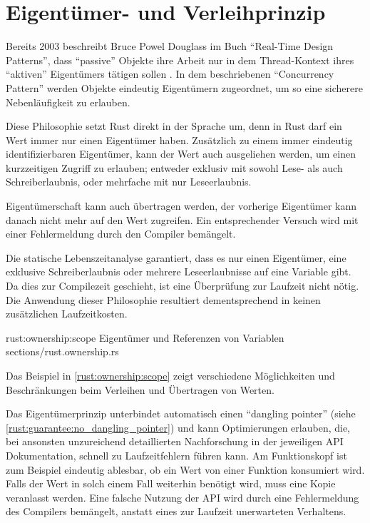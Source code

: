 \section{Eigentümer- und Verleihprinzip}
\label{rust:ownership}

Bereits 2003 beschreibt Bruce Powel Douglass im Buch \enquote{Real-Time Design Patterns}, dass \enquote{passive} Objekte ihre Arbeit nur in dem Thread-Kontext ihres \enquote{aktiven} Eigentümers tätigen sollen \cite[204]{douglass2003real}.
In dem beschriebenen \enquote{Concurrency Pattern} werden Objekte eindeutig Eigentümern zugeordnet, um so eine sicherere Nebenläufigkeit zu erlauben.

Diese Philosophie setzt Rust direkt in der Sprache um, denn in Rust darf ein Wert immer nur einen Eigentümer haben.
Zusätzlich zu einem immer eindeutig identifizierbaren Eigentümer, kann der Wert auch ausgeliehen werden, um einen kurzzeitigen Zugriff zu erlauben; entweder exklusiv mit sowohl Lese- als auch Schreiberlaubnis, oder mehrfache mit nur Leseerlaubnis.

Eigentümerschaft kann auch übertragen werden, der vorherige Eigentümer kann danach nicht mehr auf den Wert zugreifen.
Ein entsprechender Versuch wird mit einer Fehlermeldung durch den Compiler bemängelt.

Die statische Lebenszeitanalyse garantiert, dass es nur einen Eigentümer, eine exklusive Schreiberlaubnis oder mehrere Leseerlaubnisse auf eine Variable gibt.
Da dies zur Compilezeit geschieht, ist eine Überprüfung zur Laufzeit nicht nötig.
Die Anwendung dieser Philosophie resultiert dementsprechend in keinen zusätzlichen Laufzeitkosten.

\rustcinclude
	{rust:ownership:scope}
	{Eigentümer und Referenzen von Variablen}
	{sections/rust.ownership.rs}

Das Beispiel in \autoref{rust:ownership:scope} zeigt verschiedene Möglichkeiten und Beschränkungen beim Verleihen und Übertragen von Werten.

Das Eigentümerprinzip unterbindet automatisch einen \enquote{dangling pointer} (siehe \autoref{rust:guarantee:no_dangling_pointer}) und kann Optimierungen erlauben, die, bei ansonsten unzureichend detaillierten Nachforschung in der jeweiligen API Dokumentation, schnell zu Laufzeitfehlern führen kann.
Am Funktionskopf ist zum Beispiel eindeutig ablesbar, ob ein Wert von einer Funktion konsumiert wird.
Falls der Wert in solch einem Fall weiterhin benötigt wird, muss eine Kopie veranlasst werden.
Eine falsche Nutzung der API wird durch eine Fehlermeldung des Compilers bemängelt, anstatt eines zur Laufzeit unerwarteten Verhaltens.


